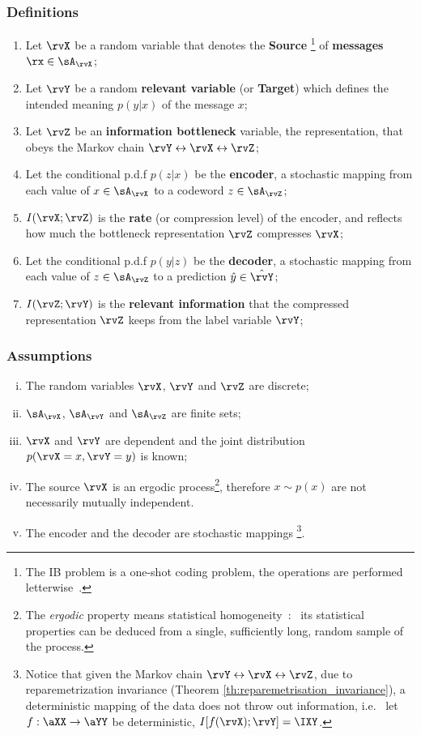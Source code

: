 \subsubsection{Definitions}
\begin{enumerate}
	\item Let $\rvX$ be a random variable that denotes the \textbf{Source} \footnote{The IB problem is a one-shot coding problem, the operations are performed letterwise~.} of \textbf{messages} $\rx \in \sA_{\rvX}$;
	\item Let $\rvY$ be a random \textbf{relevant variable}  (or \textbf{Target}) which defines the intended meaning $p(y|x)$ of the message $x$;
	\item Let $\rvZ$ be an \textbf{information bottleneck} variable, the representation, that obeys the Markov chain $\rvY \leftrightarrow \rvX \leftrightarrow \rvZ$;
	\item Let the conditional p.d.f $p(z|x)$ be the \textbf{encoder}, \ie a stochastic mapping from each value of $x \in \sA_{\rvX}$ to a codeword $z \in \sA_{\rvZ}$;
	\item $I(\rvX ; \rvZ)$ is the \textbf{rate} (or compression level) of the encoder, and reflects how much the bottleneck representation  $\rvZ$ compresses $\rvX$;
	\item Let the conditional p.d.f $p(y|z)$ be the \textbf{decoder}, \ie a stochastic mapping from each value of $z \in \sA_{\rvZ}$ to a prediction $\hat{y} \in \hat{\rvY}$;
	\item $I(\rvZ ; \rvY)$ is the \textbf{relevant information} that the compressed representation $\rvZ$ keeps from the label variable $\rvY$;
\end{enumerate}

  \subsubsection{Assumptions}\label{assumptions}
  \begin{enumerate}
    [i.]
    \item The random variables $\rvX$, $\rvY$ and $\rvZ$ are discrete;
    \item $\sA_{\rvX}$, $\sA_{\rvY}$ and $\sA_{\rvZ}$ are finite sets;
    \item $\rvX$ and $\rvY$ are dependent and the joint distribution $p(\rvX=x, \rvY=y)$ is known;
		\item The source $\rvX$ is an ergodic process\footnote{The \emph{ergodic} property means statistical homogeneity~\cite{shannon:1949}:~ its statistical properties can be deduced from a single, sufficiently long, random sample of the process.}, therefore $x \sim p(x)$ are not necessarily mutually independent.
		\item The encoder and the decoder are stochastic mappings \footnote{Notice that given the Markov chain $\rvY \leftrightarrow \rvX \leftrightarrow \rvZ$, due to reparemetrization invariance (Theorem \ref{th:reparemetrisation_invariance}), a deterministic mapping of the data does not throw out information, i.e. \ let $f:\aXX \to \aYY$ be deterministic, $I[f(\rvX);\rvY]=\IXY$.}.
  \end{enumerate}
